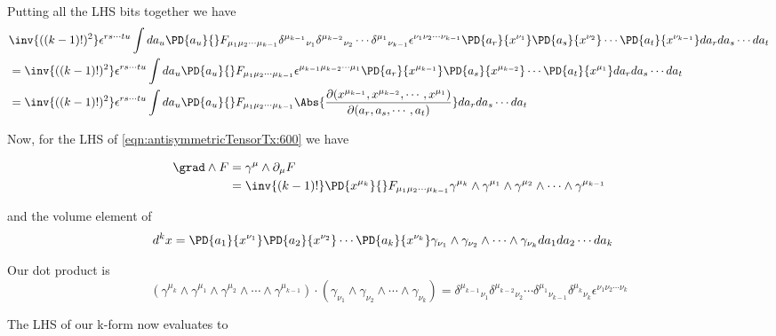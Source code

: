 Putting all the LHS bits together we have
\begin{align*}
&\inv{((k-1)!)^2} \epsilon^{ r s \cdots t u } \int da_u \PD{a_{u}}{} F_{\mu_1 \mu_2 \cdots \mu_{k-1} }
{\delta^{\mu_{k-1}}}_{\nu_1}  {\delta^{ \mu_{k-2} }}_{\nu_2}  \cdots  {\delta^{\mu_{1}} }_{\nu_{k-1}}
\epsilon^{\nu_1 \nu_2 \cdots \nu_{k-1}}
\PD{a_r}{x^{\nu_1}}
\PD{a_s}{x^{\nu_2}}
\cdots
\PD{a_t}{x^{\nu_{k-1}}}
da_r da_s \cdots da_t \\
&=\inv{((k-1)!)^2} \epsilon^{ r s \cdots t u } \int da_u \PD{a_{u}}{} F_{\mu_1 \mu_2 \cdots \mu_{k-1} }
\epsilon^{\mu_{k-1} \mu_{k-2} \cdots \mu_{1}}
\PD{a_r}{x^{\mu_{k-1}}}
\PD{a_s}{x^{\mu_{k-2}}}
\cdots
\PD{a_t}{x^{\mu_1}}
da_r da_s \cdots da_t \\
&=
\inv{((k-1)!)^2} \epsilon^{ r s \cdots t u } \int da_u \PD{a_{u}}{} F_{\mu_1 \mu_2 \cdots \mu_{k-1} }
\Abs{\frac{\partial(
x^{\mu_{k-1}},x^{\mu_{k-2}},\cdots,x^{\mu_1}
)}{\partial(a_r, a_s, \cdots, a_t)}}
da_r da_s \cdots da_t \\
\end{align*}

Now, for the LHS of \ref{eqn:antisymmetricTensorTx:600} we have

\begin{align*}
\grad \wedge F 
&=
\gamma^\mu \wedge \partial_\mu F \\
&=
\inv{(k-1)!}\PD{x^{\mu_k}}{} F_{\mu_1 \mu_2 \cdots \mu_{k-1}}
\gamma^{\mu_k} \wedge
\gamma^{\mu_1} \wedge \gamma^{ \mu_2 } \wedge \cdots \wedge \gamma^{\mu_{k-1}} 
\end{align*}

and the volume element of
\begin{align*}
d^k x 
&=
\PD{a_1}{x^{\nu_1}}
\PD{a_2}{x^{\nu_2}}
\cdots
\PD{a_k}{x^{\nu_{k}}}
\gamma_{\nu_1} \wedge \gamma_{ \nu_2 } \wedge \cdots \wedge \gamma_{\nu_k}
da_1 da_2 \cdots da_k
\end{align*}

Our dot product is
\begin{equation}\label{eqn:antisymmetricTensorTx:630}
\left(\gamma^{\mu_k} \wedge
\gamma^{\mu_1} \wedge \gamma^{ \mu_2 } \wedge \cdots \wedge \gamma^{\mu_{k-1}} \right) \cdot
\left( \gamma_{\nu_1} \wedge \gamma_{ \nu_2 } \wedge \cdots \wedge \gamma_{\nu_k} \right)
=
{\delta^{\mu_{k-1}}}_{\nu_1}  {\delta^{ \mu_{k-2} }}_{\nu_2}  \cdots  
{\delta^{\mu_{1}} }_{\nu_{k-1}}
{\delta^{\mu_{k}} }_{\nu_{k}}
\epsilon^{\nu_1 \nu_2 \cdots \nu_{k}}
\end{equation}

The LHS of our k-form now evaluates to

